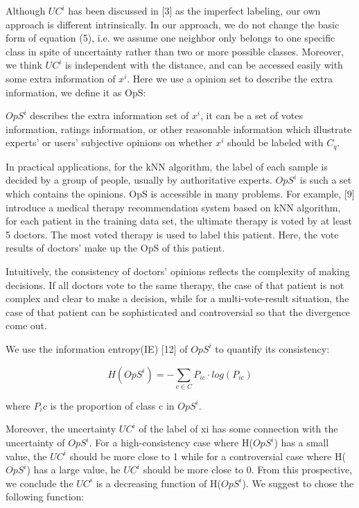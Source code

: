 \documentclass[runningheads]{llncs}
\begin{document}
Although $UC^i$ has been discussed in [3] as the imperfect labeling, our own approach is different intrinsically. In our approach, we do not change the basic form of equation (5), i.e. we assume one neighbor only belongs  to one specific class in spite of uncertainty rather than two or more possible classes. Moreover,  we think $UC^i$ is independent with the distance, and can be accessed easily with some extra information of $x^i$. Here we use a opinion set to describe the extra information, we define it as OpS:

\begin{definition}
 $OpS^i$ describes the extra information set of $x^i$, it can be a set of votes information, ratings information, or other reasonable information which illustrate experts' or users' subjective opinions on whether $x^i$ should be labeled with $C_q$.
\end{definition}

In practical applications, for the kNN algorithm, the label of each sample is decided by a group of people, usually by authoritative experts. $OpS^i$ is such a set which contains the opinions. OpS is accessible in many problems. For example, [9] introduce a medical therapy recommendation system based on kNN algorithm, for each patient in the training data set,  the ultimate therapy is voted by at least 5 doctors. The most voted therapy is used to label this patient. Here, the vote results of doctors' make up the OpS of this patient.

Intuitively, the consistency of doctors' opinions reflects the complexity of making decisions. If all doctors vote to the same therapy, the case of that patient is not complex and clear to make a decision, while for a multi-vote-result situation, the case of that patient can be sophisticated and controversial so that the divergence come out. 

We use the information entropy(IE) [12] of $OpS^i$ to quantify its consistency:

\begin{equation}
H(OpS^i) =- \sum_{c \in C} P_{ic} \cdot log (P_{ic})
\end{equation}

where $P_ic$ is the proportion of class c in $OpS^i$.

Moreover, the uncertainty $UC^i$ of the label of xi has some connection with the uncertainty of $OpS^i$. For a high-consistency case where H($OpS^i$) has a small value, the $UC^i$ should be more close to 1 while for a controversial case where H($OpS^i$) has a large value, he $UC^i$ should be more close to 0. From this prospective, we conclude the $UC^i$ is a decreasing function of H($OpS^i$). We suggest to chose the following function:
\end{document}
